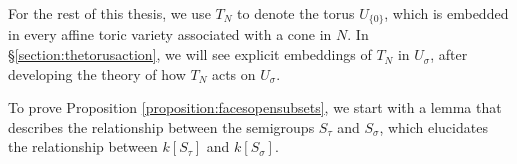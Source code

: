 \documentclass[12pt]{amsart}
\theoremstyle{plain}
\theoremstyle{definition}
\begin{document}

For the rest of this thesis, we use $T_N$ to denote the torus $U_{\{0\}}$, which is embedded in every affine toric variety associated with a cone in $N$.
In \S \ref{section:thetorusaction}, we will see explicit embeddings of $T_N$ in $U_\sigma$, after developing the theory of how $T_N$ acts on $U_\sigma$.

To prove Proposition \ref{proposition:facesopensubsets}, we start with a lemma that describes the relationship between the semigroups $S_\tau$ and $S_\sigma$, which elucidates the relationship between $k[S_\tau]$ and $k[S_\sigma]$.
\end{document}
